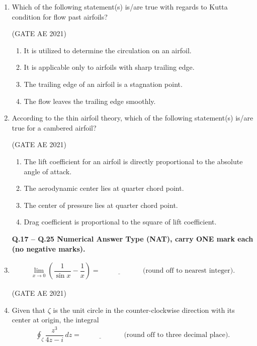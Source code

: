 \documentclass[journal,12pt,onecolumn]{IEEEtran}
\theoremstyle{remark}
\begin{document}
\begin{flushleft}
\begin{enumerate}
\item 
Which of the following statement(s) is/are true with regards to Kutta condition for flow past airfoils?

\hfill (GATE AE 2021)

\begin{enumerate}
\item It is utilized to determine the circulation on an airfoil.
\item It is applicable only to airfoils with sharp trailing edge.
\item The trailing edge of an airfoil is a stagnation point.
\item The flow leaves the trailing edge smoothly.
\end{enumerate}
\item 
According to the thin airfoil theory, which of the following statement(s) is/are true for a cambered airfoil?

\hfill (GATE AE 2021)

\begin{enumerate}
\item The lift coefficient for an airfoil is directly proportional to the absolute angle of attack.
\item The aerodynamic center lies at quarter chord point.
\item The center of pressure lies at quarter chord point.
\item Drag coefficient is proportional to the square of lift coefficient.
\end{enumerate}
\textbf{Q.17 -- Q.25 Numerical Answer Type (NAT), carry ONE mark each (no negative marks).}

\item 
\begin{align*}
\lim_{x \to 0} \left( \dfrac{1}{\sin x} - \dfrac{1}{x} \right) = \; \underline{\hspace{2cm}} \quad \text{(round off to nearest integer).}
\end{align*}

\hfill (GATE AE 2021)

\item 
Given that $\zeta$ is the unit circle in the counter-clockwise direction with its center at origin, the integral
\begin{align*}
\oint_{\zeta} \dfrac{z^3}{4z - i}\, dz = \; \underline{\hspace{2cm}} \quad \text{(round off to three decimal place).}
\end{align*}


\end{enumerate}
\end{flushleft}
\end{document}
